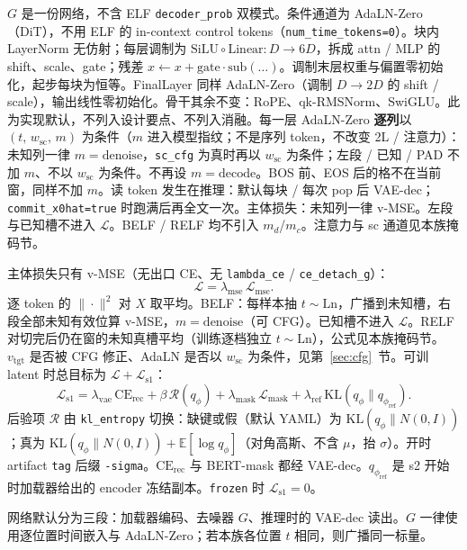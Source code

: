 \documentclass[UTF8,a4paper,11pt]{ctexart}
\begin{document}
\(G\) 是一份网络，不含 ELF \texttt{decoder\_prob} 双模式。条件通道为 AdaLN-Zero（DiT），不用 ELF 的 in-context control tokens（\texttt{num\_time\_tokens=0}）。块内 LayerNorm 无仿射；每层调制为 \(\mathrm{SiLU}\circ\mathrm{Linear}:D\to 6D\)，拆成 attn / MLP 的 shift、scale、gate；残差 \(x\leftarrow x+\mathrm{gate}\cdot\mathrm{sub}(\ldots)\)。调制末层权重与偏置零初始化，起步每块为恒等。FinalLayer 同样 AdaLN-Zero（调制 \(D\to 2D\) 的 shift / scale），输出线性零初始化。骨干其余不变：RoPE、qk-RMSNorm、SwiGLU。此为实现默认，不列入设计要点、不列入消融。每一层 AdaLN-Zero \textbf{逐列}以 \((t,\,w_{\mathrm{sc}},\,m)\) 为条件（\(m\) 进入模型指纹；不是序列 token，不改变 2L / 注意力）：未知列一律 \(m=\mathrm{denoise}\)，\texttt{sc\_cfg} 为真时再以 \(w_{\mathrm{sc}}\) 为条件；左段 / 已知 / PAD 不加 \(m\)、不以 \(w_{\mathrm{sc}}\) 为条件。不再设 \(m=\mathrm{decode}\)。BOS 前、EOS 后的格不在当前窗，同样不加 \(m\)。读 token 发生在推理：默认每块 / 每次 pop 后 VAE-dec；\texttt{commit\_x0hat=true} 时跑满后再全文一次。主体损失：未知列一律 v-MSE。左段与已知槽不进入 \(\mathcal{L}\)。BELF / RELF 均不引入 \(m_d\)/\(m_c\)。注意力与 sc 通道见本族掩码节。

主体损失只有 v-MSE（无出口 CE、无 \texttt{lambda\_ce} / \texttt{ce\_detach\_g}）：
\[
\mathcal{L}
=\lambda_{\mathrm{mse}}\,\mathcal{L}_{\mathrm{mse}}.
\]
逐 token 的 \(\|\cdot\|^2\) 对 \(X\) 取平均。BELF：每样本抽 \(t\sim\mathrm{Ln}\)，广播到未知槽，右段全部未知有效位算 v-MSE，\(m=\mathrm{denoise}\)（可 CFG）。已知槽不进入 \(\mathcal{L}\)。RELF 对切完后仍在窗的未知真槽平均（训练逐档独立 \(t\sim\mathrm{Ln}\)），公式见本族掩码节。\(v_{\mathrm{tgt}}\) 是否被 CFG 修正、AdaLN 是否以 \(w_{\mathrm{sc}}\) 为条件，见第~\ref{sec:cfg}~节。可训 latent 时总目标为 \(\mathcal{L}+\mathcal{L}_{\mathrm{s1}}\)：
\[
\mathcal{L}_{\mathrm{s1}}
=\lambda_{\mathrm{vae}}\,\mathrm{CE}_{\mathrm{rec}}
+\beta\,\mathcal{R}(q_\phi)
+\lambda_{\mathrm{mask}}\,\mathcal{L}_{\mathrm{mask}}
+\lambda_{\mathrm{ref}}\,\mathrm{KL}(q_\phi\|q_{\phi_{\mathrm{ref}}}).
\]
后验项 \(\mathcal{R}\) 由 \texttt{kl\_entropy} 切换：缺键或假（默认 YAML）为 \(\mathrm{KL}(q_\phi\|N(0,I))\)；真为 \(\mathrm{KL}(q_\phi\|N(0,I))+\mathbb{E}[\log q_\phi]\)（对角高斯、不含 \(\mu\)，抬 \(\sigma\)）。开时 artifact \texttt{tag} 后缀 \texttt{-sigma}。\(\mathrm{CE}_{\mathrm{rec}}\) 与 BERT-mask 都经 VAE-dec。\(q_{\phi_{\mathrm{ref}}}\) 是 s2 开始时加载器给出的 encoder 冻结副本。\texttt{frozen} 时 \(\mathcal{L}_{\mathrm{s1}}=0\)。

网络默认分为三段：加载器编码、去噪器 \(G\)、推理时的 VAE-dec 读出。\(G\) 一律使用逐位置时间嵌入与 AdaLN-Zero；若本族各位置 \(t\) 相同，则广播同一标量。
\end{document}
